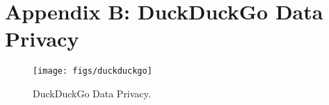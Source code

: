 \section{Appendix B: DuckDuckGo Data Privacy}

\begin{figure}[H]
  \centering
  \texttt{[image: figs/duckduckgo]}
  \caption{DuckDuckGo Data Privacy.}
  \label{fig::1}
\end{figure}


